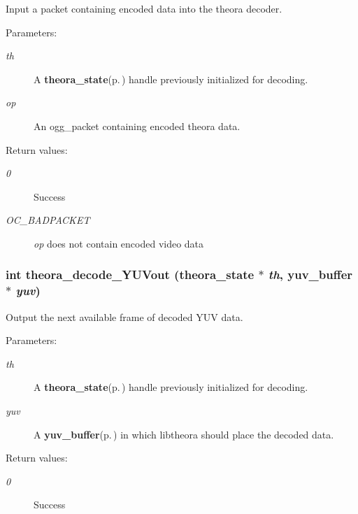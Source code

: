 Input a packet containing encoded data into the theora decoder. 

\begin{Desc}
\item[Parameters:]
\begin{description}
\item[{\em th}]A {\bf theora\_\-state}{\rm (p.\,\pageref{structtheora__state})} handle previously initialized for decoding. \item[{\em op}]An ogg\_\-packet containing encoded theora data. \end{description}
\end{Desc}
\begin{Desc}
\item[Return values:]
\begin{description}
\item[{\em 0}]Success \item[{\em OC\_\-BADPACKET}]{\em op\/} does not contain encoded video data \end{description}
\end{Desc}
\subsubsection{\setlength{\rightskip}{0pt plus 5cm}int theora\_\-decode\_\-YUVout ({\bf theora\_\-state} $\ast$ {\em th}, {\bf yuv\_\-buffer} $\ast$ {\em yuv})}\label{theora_8h_38049cd76f6f1d30906344dcc747782c}


Output the next available frame of decoded YUV data. 

\begin{Desc}
\item[Parameters:]
\begin{description}
\item[{\em th}]A {\bf theora\_\-state}{\rm (p.\,\pageref{structtheora__state})} handle previously initialized for decoding. \item[{\em yuv}]A {\bf yuv\_\-buffer}{\rm (p.\,\pageref{structyuv__buffer})} in which libtheora should place the decoded data. \end{description}
\end{Desc}
\begin{Desc}
\item[Return values:]
\begin{description}
\item[{\em 0}]Success \end{description}
\end{Desc}

